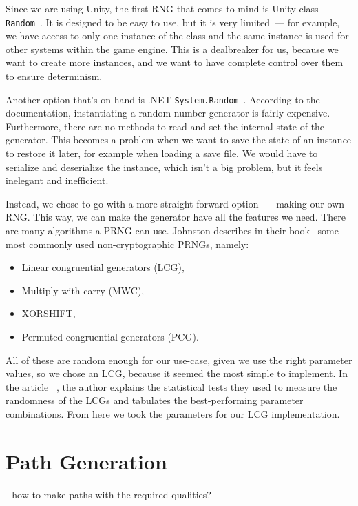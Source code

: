 Since we are using Unity, the first RNG that comes to mind is Unity class \texttt{Random}~\cite{UnityRandom}.
It is designed to be easy to use, but it is very limited~--- for example, we have access to only one instance of the class and the same instance is used for other systems within the game engine.
This is a dealbreaker for us, because we want to create more instances, and we want to have complete control over them to ensure determinism.

Another option that's on-hand is .NET \texttt{System.Random}~\cite{SystemRandom}.
According to the documentation, instantiating a random number generator is fairly expensive.
Furthermore, there are no methods to read and set the internal state of the generator.
This becomes a problem when we want to save the state of an instance to restore it later, for example when loading a save file.
We would have to serialize and deserialize the instance, which isn't a big problem, but it feels inelegant and inefficient.

Instead, we chose to go with a more straight-forward option~--- making our own RNG.
This way, we can make the generator have all the features we need.
There are many algorithms a PRNG can use.
Johnston describes in their book~\cite{johnston2018random} some most commonly used non-cryptographic PRNGs, namely:
\begin{itemize}
    \item Linear congruential generators (LCG),
    \item Multiply with carry (MWC),
    \item XORSHIFT,
    \item Permuted congruential generators (PCG).
\end{itemize}
All of these are random enough for our use-case, given we use the right parameter values, so we chose an LCG, because it seemed the most simple to implement.
In the article ~\cite{LCGTables}, the author explains the statistical tests they used to measure the randomness of the LCGs and tabulates the best-performing parameter combinations.
From here we took the parameters for our LCG implementation.


\section{Path Generation}

- how to make paths with the required qualities?

